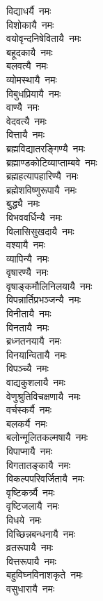 \begin{multicols}{\maxColumns}
\begin{flushleft}
विद्याधर्यै~नमः\\
विशोकायै~नमः\\
वयोवृन्दनिषेवितायै~नमः\\
बहूदकायै~नमः\hfill{}\\
बलवत्यै~नमः\\
व्योमस्थायै~नमः\\
विबुधप्रियायै~नमः\\
वाण्यै~नमः\\
वेदवत्यै~नमः\\
वित्तायै~नमः\\
ब्रह्मविद्यातरङ्गिण्यै~नमः\\
ब्रह्माण्डकोटिव्याप्ताम्बवे~नमः\\
ब्रह्महत्यापहारिण्यै~नमः\\
ब्रह्मेशविष्णुरूपायै~नमः\hfill{}\\
बुद्ध्यै~नमः\\
विभववर्धिन्यै~नमः\\
विलासिसुखदायै~नमः\\
वश्यायै~नमः\\
व्यापिन्यै~नमः\\
वृषारण्यै~नमः\\
वृषाङ्कमौलिनिलयायै~नमः\\
विपन्नार्तिप्रभञ्जन्यै~नमः\\
विनीतायै~नमः\\
विनतायै~नमः\hfill{}\\
ब्रध्नतनयायै~नमः\\
विनयान्वितायै~नमः\\
विपञ्च्यै~नमः\\
वाद्यकुशलायै~नमः\\
वेणुश्रुतिविचक्षणायै~नमः\\
वर्चस्कर्यै~नमः\\
बलकर्यै~नमः\\
बलोन्मूलितकल्मषायै~नमः\\
विपाप्मायै~नमः\\
विगतातङ्कायै~नमः\hfill{}\\
विकल्पपरिवर्जितायै~नमः\\
वृष्टिकर्त्र्यै~नमः\\
वृष्टिजलायै~नमः\\
विधये~नमः\\
विच्छिन्नबन्धनायै~नमः\\
व्रतरूपायै~नमः\\
वित्तरूपायै~नमः\\
बहुविघ्नविनाशकृते~नमः\\
वसुधारायै~नमः\\

\end{flushleft}
\end{multicols}
